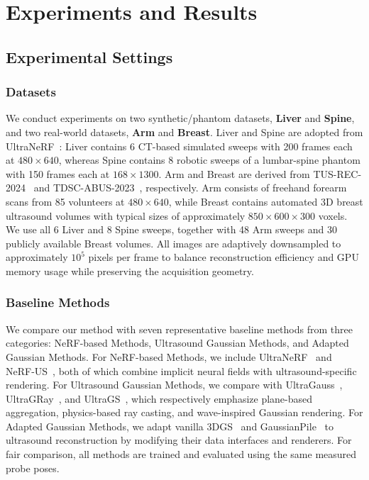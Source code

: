 \vspace{-1mm}
\section{Experiments and Results}
\label{sec:experiments}
\label{sec:results}

\subsection{Experimental Settings}
\label{sec:experiments:settings}

\subsubsection{Datasets}
\label{sec:experiments:datasets}

We conduct experiments on two synthetic/phantom datasets, \textbf{Liver} and
\textbf{Spine}, and two real-world datasets, \textbf{Arm} and
\textbf{Breast}. Liver and Spine are adopted from
UltraNeRF~\cite{wysockiUltraNeRFNeuralRadiance2024}: Liver contains 6
CT-based simulated sweeps with 200 frames each at $480\times640$, whereas
Spine contains 8 robotic sweeps of a lumbar-spine phantom with 150 frames
each at $168\times1300$. Arm and Breast are derived from
TUS-REC-2024~\cite{liTUSREC2024Challenge2025} and
TDSC-ABUS-2023~\cite{luoTDSCABUSChallenge2025}, respectively. Arm consists of
freehand forearm scans from 85 volunteers at $480\times640$, while Breast
contains automated 3D breast ultrasound volumes with typical sizes of
approximately $850\times600\times300$ voxels. We use all 6 Liver and 8 Spine
sweeps, together with 48 Arm sweeps and 30 publicly available Breast volumes.
All images are adaptively downsampled to approximately $10^5$ pixels per frame
to balance reconstruction efficiency and GPU memory usage while preserving the
acquisition geometry.

\subsubsection{Baseline Methods}
\label{sec:experiments:baselines}

We compare our method with seven representative baseline methods from three
categories: NeRF-based Methods, Ultrasound Gaussian Methods, and Adapted
Gaussian Methods. For NeRF-based Methods, we include
UltraNeRF~\cite{wysockiUltraNeRFNeuralRadiance2024} and
NeRF-US~\cite{dagliNeRFUSRemovingUltrasound2024}, both of which
combine implicit neural fields with ultrasound-specific rendering. For
Ultrasound Gaussian Methods, we compare with
UltraGauss~\cite{eidUltraGaussUltrafastGaussian2025},
UltraGRay~\cite{duelmerUltraGRayPhysicsBasedGaussian2026}, and
UltraGS~\cite{yangUltraGSRealTimePhysicallyDecoupled2025}, which respectively
emphasize plane-based aggregation, physics-based ray casting, and wave-inspired
Gaussian rendering. For Adapted Gaussian Methods, we adapt vanilla
3DGS~\cite{kerbl3DGaussianSplatting2023} and
GaussianPile~\cite{kongGaussianPileUnifiedSparse2026} to ultrasound
reconstruction by modifying their data interfaces and renderers.
For fair comparison, all methods are trained and evaluated using the same
measured probe poses.

